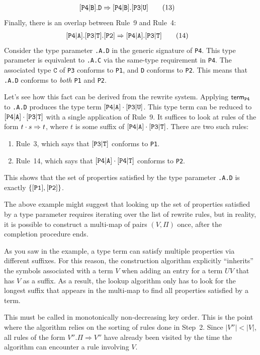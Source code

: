 \documentclass[../generics]{subfiles}
\begin{document}
\begin{example}
\begin{align}
[\texttt{P4}|\texttt{B}].\texttt{D}&\Rightarrow[\texttt{P4}|\texttt{B}].[\texttt{P3}|\texttt{U}]\tag{13}
\end{align}
Finally, there is an overlap between Rule~9 and Rule~4:
\begin{align}
[\texttt{P4}|\texttt{A}].[\texttt{P3}|\texttt{T}].[\texttt{P2}]&\Rightarrow[\texttt{P4}|\texttt{A}].[\texttt{P3}|\texttt{T}]\tag{14}
\end{align}
Consider the type parameter \texttt{\rT.A.D} in the generic signature of \texttt{P4}. This type parameter is equivalent to \texttt{\rT.A.C} via the same-type requirement in \texttt{P4}. The associated type $\texttt{C}$ of \texttt{P3} conforms to \texttt{P1}, and \texttt{D} conforms to \texttt{P2}. This means that \texttt{\rT.A.D} conforms to \emph{both} \texttt{P1} and \texttt{P2}.

Let's see how this fact can be derived from the rewrite system. Applying $\mathsf{term}_{\texttt{P4}}$ to \texttt{\rT.A.D} produces the type term $[\texttt{P4}|\texttt{A}]\cdot[\texttt{P3}|\texttt{U}]$. This type term can be reduced to $[\texttt{P4}|\texttt{A}]\cdot[\texttt{P3}|\texttt{T}]$ with a single application of Rule~9. It suffices to look at rules of the form $t \cdot s \Rightarrow t$, where $t$ is some suffix of $[\texttt{P4}|\texttt{A}]\cdot[\texttt{P3}|\texttt{T}]$. There are two such rules:
\begin{enumerate}
\item Rule~3, which says that $[\texttt{P3}|\texttt{T}]$ conforms to \texttt{P1}.
\item Rule~14, which says that $[\texttt{P4}|\texttt{A}]\cdot[\texttt{P4}|\texttt{T}]$ conforms to \texttt{P2}.
\end{enumerate}
This shows that the set of properties satisfied by the type parameter \texttt{\rT.A.D} is exactly $\{[\texttt{P1}],[\texttt{P2}]\}$.
\end{example}
The above example might suggest that looking up the set of properties satisfied by a type parameter requires iterating over the list of rewrite rules, but in reality, it is possible to construct a multi-map of pairs $(V, \Pi)$ once, after the completion procedure ends.

As you saw in the example, a type term can satisfy multiple properties via different suffixes. For this reason, the construction algorithm explicitly
``inherits'' the symbols associated with a term $V$ when adding an entry for a term $UV$ that has $V$ as a suffix. As a result, the lookup algorithm only has to look for the longest suffix that appears in the multi-map to find all properties satisfied by a term.

This must be called in monotonically non-decreasing key order. 
This is the point where the algorithm relies on the sorting of rules done in Step~2. Since
$|V''|<|V|$, all rules of the form $V''.\Pi\Rightarrow V''$ have already been visited by the time
the algorithm can encounter a rule involving $V$.
\end{document}
